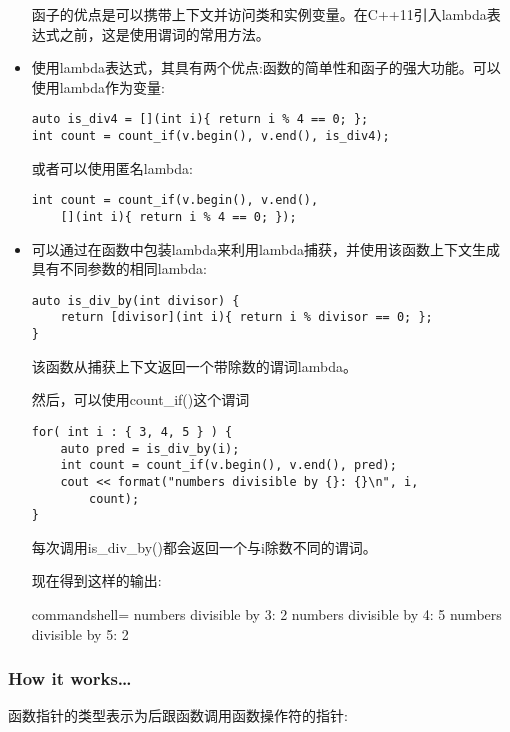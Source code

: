 \begin{itemize}
函子的优点是可以携带上下文并访问类和实例变量。在C++11引入lambda表达式之前，这是使用谓词的常用方法。

\item 
使用lambda表达式，其具有两个优点:函数的简单性和函子的强大功能。可以使用lambda作为变量:

\begin{lstlisting}[style=styleCXX]
auto is_div4 = [](int i){ return i % 4 == 0; };
int count = count_if(v.begin(), v.end(), is_div4);
\end{lstlisting}

或者可以使用匿名lambda:

\begin{lstlisting}[style=styleCXX]
int count = count_if(v.begin(), v.end(),
	[](int i){ return i % 4 == 0; });
\end{lstlisting}

\item 
可以通过在函数中包装lambda来利用lambda捕获，并使用该函数上下文生成具有不同参数的相同lambda:

\begin{lstlisting}[style=styleCXX]
auto is_div_by(int divisor) {
	return [divisor](int i){ return i % divisor == 0; };
}
\end{lstlisting}

该函数从捕获上下文返回一个带除数的谓词lambda。

然后，可以使用count\_if()这个谓词

\begin{lstlisting}[style=styleCXX]
for( int i : { 3, 4, 5 } ) {
	auto pred = is_div_by(i);
	int count = count_if(v.begin(), v.end(), pred);
	cout << format("numbers divisible by {}: {}\n", i,
		count);
}
\end{lstlisting}

每次调用is\_div\_by()都会返回一个与i除数不同的谓词。

现在得到这样的输出:

\begin{tcblisting}{commandshell={}}
numbers divisible by 3: 2
numbers divisible by 4: 5
numbers divisible by 5: 2
\end{tcblisting}
\end{itemize}

\subsubsection{How it works…}

函数指针的类型表示为后跟函数调用函数操作符的指针:

